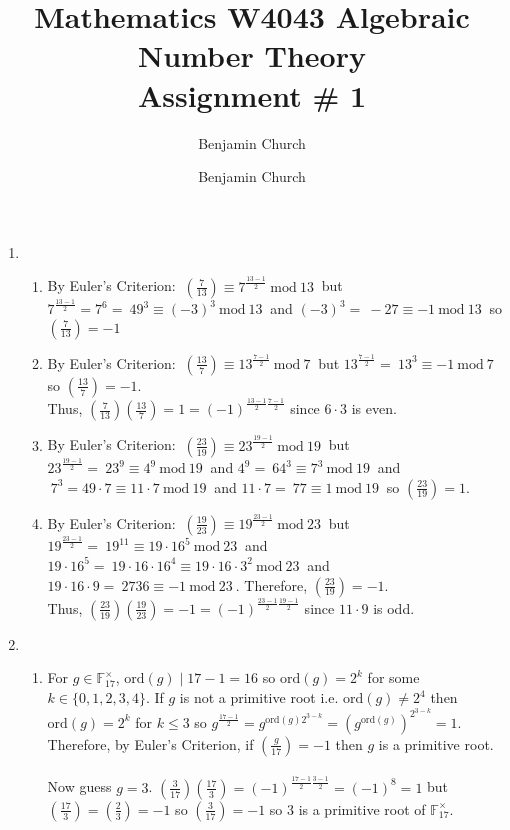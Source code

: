 \documentclass[12pt]{extarticle}
\author{Benjamin Church }
\newcommand{\legsym}[2]{\left(\frac{#1}{#2} \right)}
\renewcommand{\mod}[3]{\: #1 \equiv #2 \: \mathrm{mod} \: #3 \:}
\newcommand{\finunits}[1]{\mathbb{F}_{#1}^{\times}}
\newcommand{\ord}[1]{\mathrm{ord}\! \left(#1 \right)}
\newcommand{\atitle}[1]{\title{%
	\large \textbf{Mathematics W4043 Algebraic Number Theory
	\\ Assignment \# #1} \vspace{-2ex}}
\author{Benjamin Church }
\maketitle}
\begin{document}
\atitle{1}
 
\begin{enumerate}
\item
\begin{enumerate}
\item By Euler's Criterion: $\mod{\legsym{7}{13}}{7^{\frac{13-1}{2}}}{13}$ but $7^{\frac{13-1}{2}} = 7^6 = \mod{49^3}{(-3)^3}{13}$ and $(-3)^3 = \mod{-27}{-1}{13}$ so $\legsym{7}{13} = -1$

\item By Euler's Criterion: $\mod{\legsym{13}{7}}{13^{\frac{7-1}{2}}}{7}$ but $13^{\frac{7-1}{2}} = \mod{13^3}{-1}{7}$ so $\legsym{13}{7} = -1$. \\ 

Thus, $\legsym{7}{13} \legsym{13}{7} = 1 = (-1)^{\frac{13-1}{2} \frac{7-1}{2}}$ since $6 \cdot 3$ is even. 

\item By Euler's Criterion: $\mod{\legsym{23}{19}}{23^{\frac{19-1}{2}}}{19}$ but $23^{\frac{19-1}{2}} = \mod{23^9}{4^9}{19}$ and $4^9 = \mod{64^3}{7^3}{19}$ and $\mod{7^3 = 49 \cdot 7}{11 \cdot 7}{19}$ and $11 \cdot 7 = \mod{77}{1}{19}$ so $\legsym{23}{19} = 1$. 

\item By Euler's Criterion: $\mod{\legsym{19}{23}}{19^{\frac{23-1}{2}}}{23}$ but $19^{\frac{23-1}{2}} = \mod{19^11}{19 \cdot 16^5}{23}$ and $19 \cdot 16^5 = \mod{19 \cdot 16 \cdot 16^4}{19 \cdot 16 \cdot 3^2}{23}$ and $19 \cdot 16 \cdot 9 = \mod{2736}{-1}{23}$. Therefore, $\legsym{23}{19} = -1$. \\ 

Thus, $\legsym{23}{19} \legsym{19}{23} = -1 = (-1)^{\frac{23-1}{2} \frac{19-1}{2}}$ since $11 \cdot 9$ is odd. 

\end{enumerate}

\item 
\begin{enumerate}
\item For $g \in \finunits{17}$, $\ord{g} \mid 17-1 = 16$ so $\ord{g} = 2^k$ for some $k \in \{0, 1, 2, 3, 4\}$. If $g$ is not a primitive root i.e. $\ord{g} \neq 2^4$ then $\ord{g} = 2^k$ for $k \leq 3$ so $g^{\frac{17-1}{2}} = g^{\ord{g} 2^{3-k}} = (g^{\ord{g}})^{2^{3-k}} = 1$. Therefore, by Euler's Criterion, if $\legsym{g}{17} = -1$ then $g$ is a primitive root. \\ \\
Now guess $g = 3$. $\legsym{3}{17} \legsym{17}{3} = (-1)^{\frac{17-1}{2} \frac{3-1}{2}} = (-1)^8 = 1$ but $\legsym{17}{3} = \legsym{2}{3} = -1$ so $\legsym{3}{17} = -1$ so $3$ is a primitive root of $\finunits{17}$. \\ \\


\end{enumerate}
\end{enumerate}
\end{document}
